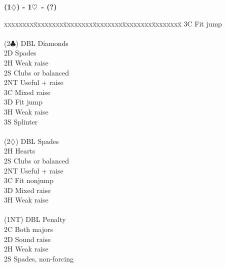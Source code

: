 \documentclass[10pt]{article}
\renewcommand{\c}{$\clubsuit$}
\renewcommand{\d}{$\diamondsuit$}
\newcommand{\h}{$\heartsuit$}
\newenvironment{bidtable}[1][]
{\textbf{#1}
  \begin{adjustwidth}{1em}{}
    \addvspace{2pt}
    \begin{tabbing}
      xxxxxxxx\=xxxxxxxx\=xxxxxxxx\=xxxxxxxx\=xxxxxxxx\=xxxxxxxx\=\kill}
{\end{tabbing}\end{adjustwidth}\bigskip}%
\begin{document}
\begin{multicols*}{2}
\begin{bidtable}[(1\d) - 1\h\ - (?)]
       \> 3C     \> Fit jump                                         \\
                                                                     \\
(2\c)  \> DBL    \> Diamonds                                         \\
       \> 2D     \> Spades                                           \\
       \> 2H     \> Weak raise                                       \\
       \> 2S     \> Clubs or balanced                                \\
       \> 2NT    \> Useful + raise                                   \\
       \> 3C     \> Mixed raise                                      \\
       \> 3D     \> Fit jump                                         \\
       \> 3H     \> Weak raise                                       \\
       \> 3S     \> Splinter                                         \\
                                                                     \\
(2\d)  \> DBL    \> Spades                                           \\
       \> 2H     \> Hearts                                           \\
       \> 2S     \> Clubs or balanced                                \\
       \> 2NT    \> Useful + raise                                   \\
       \> 3C     \> Fit nonjump                                      \\
       \> 3D     \> Mixed raise                                      \\
       \> 3H     \> Weak raise                                       \\
                                                                     \\
(1NT)  \> DBL    \> Penalty                                          \\
       \> 2C     \> Both majors                                      \\
       \> 2D     \> Sound raise                                      \\
       \> 2H     \> Weak raise                                       \\
       \> 2S     \> Spades, non-forcing
\end{bidtable}


\end{multicols*}
\end{document}
